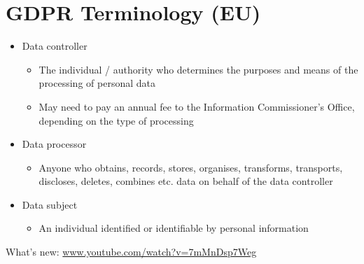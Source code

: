 \documentclass{article}
\begin{document}
\section{GDPR Terminology (EU)}
\begin{itemize}
\item Data controller
\begin{itemize}
\item The individual / authority who determines the purposes and means of the processing of personal data 
\item May need to pay an annual fee to the Information Commissioner's Office, depending on the type of processing
\end{itemize}

\item Data processor
\begin{itemize}
\item Anyone who obtains, records, stores, organises, transforms, transports, discloses, deletes, combines etc. data on behalf of the data controller
\end{itemize}

\item Data subject
\begin{itemize}
\item An individual identified or identifiable by personal information
\end{itemize}
\end{itemize}

\bigskip
What's new: \href{https://www.youtube.com/watch?v=7mMnDsp7Weg}{www.youtube.com/watch?v=7mMnDsp7Weg}
\end{document}
